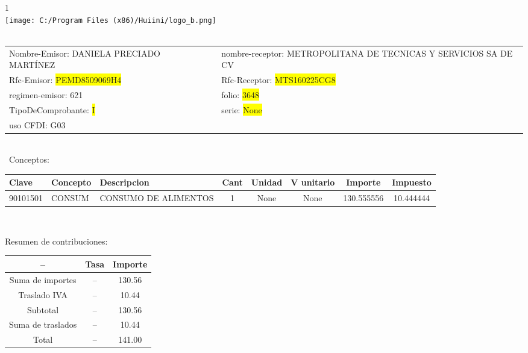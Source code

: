 \documentclass{article}
\begin{document}
\hspace{18cm} 1\\
\texttt{[image: C:/Program Files (x86)/Huiini/logo\_b.png]}
\bigskip\\\
\begin{tabular}{p{11cm}p{1cm}p{8cm}}

Nombre-Emisor: DANIELA PRECIADO MARTÍNEZ && nombre-receptor: METROPOLITANA DE TECNICAS Y SERVICIOS SA DE CV\\

Rfc-Emisor: \colorbox{yellow}{ PEMD8509069H4 } & & Rfc-Receptor: \colorbox{yellow}{ MTS160225CG8 }\\

regimen-emisor: 621 & & folio: \colorbox{yellow}{ 3648 }\\

TipoDeComprobante: \colorbox{yellow}{ I } & & serie: \colorbox{yellow}{ None }\\

uso CFDI: G03\\



\end{tabular}
\bigskip\bigskip\bigskip\\\
Conceptos:\\
\begin{tabular}{|p{1.5cm}|p{3.6cm}|p{3.6cm}|c|c|c|c|c|}
\hline
Clave & Concepto & Descripcion & Cant & Unidad & V unitario & Importe & Impuesto \\
\hline

90101501 & CONSUM & CONSUMO DE ALIMENTOS & 1 & None & None & 130.555556 &  10.444444 \\
\hline

\end{tabular}\\
\bigskip
\begin{center}
Resumen de contribuciones:\\
\bigskip
\begin{tabular}{|c|c|c|}
\hline
 -- & Tasa & Importe\\
\hline

Suma de importes & -- & 130.56 \\
\hline

Traslado IVA & -- & 10.44 \\
\hline

Subtotal  & -- & 130.56 \\
\hline

Suma de traslados & -- & 10.44 \\
\hline

Total  & -- & 141.00 \\
\hline

\end{tabular}
\end{center}
\end{document}
